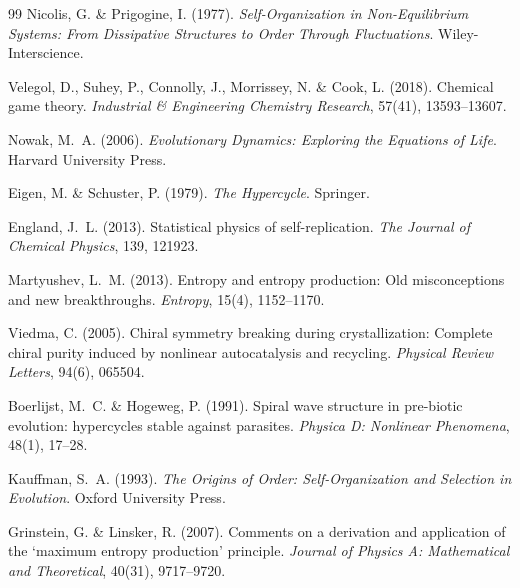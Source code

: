 \documentclass[12pt,a4paper]{article}
\theoremstyle{remark}
\begin{document}
\begin{thebibliography}{99}
Nicolis, G. \& Prigogine, I. (1977).
\newblock \textit{Self-Organization in Non-Equilibrium Systems: From Dissipative Structures to Order Through Fluctuations}.
\newblock Wiley-Interscience.

Velegol, D., Suhey, P., Connolly, J., Morrissey, N. \& Cook, L. (2018).
\newblock Chemical game theory.
\newblock \textit{Industrial \& Engineering Chemistry Research}, 57(41), 13593--13607.

Nowak, M.~A. (2006).
\newblock \textit{Evolutionary Dynamics: Exploring the Equations of Life}.
\newblock Harvard University Press.

Eigen, M. \& Schuster, P. (1979).
\newblock \textit{The Hypercycle}.
\newblock Springer.

England, J.~L. (2013).
\newblock Statistical physics of self-replication.
\newblock \textit{The Journal of Chemical Physics}, 139, 121923.

Martyushev, L.~M. (2013).
\newblock Entropy and entropy production: Old misconceptions and new breakthroughs.
\newblock \textit{Entropy}, 15(4), 1152--1170.


Viedma, C. (2005).
\newblock Chiral symmetry breaking during crystallization: Complete chiral purity induced by nonlinear autocatalysis and recycling.
\newblock \textit{Physical Review Letters}, 94(6), 065504.

Boerlijst, M.~C. \& Hogeweg, P. (1991).
\newblock Spiral wave structure in pre-biotic evolution: hypercycles stable against parasites.
\newblock \textit{Physica D: Nonlinear Phenomena}, 48(1), 17--28.

Kauffman, S.~A. (1993).
\newblock \textit{The Origins of Order: Self-Organization and Selection in Evolution}.
\newblock Oxford University Press.

Grinstein, G. \& Linsker, R. (2007).
\newblock Comments on a derivation and application of the `maximum entropy production' principle.
\newblock \textit{Journal of Physics A: Mathematical and Theoretical}, 40(31), 9717--9720.


\end{thebibliography}
\end{document}
